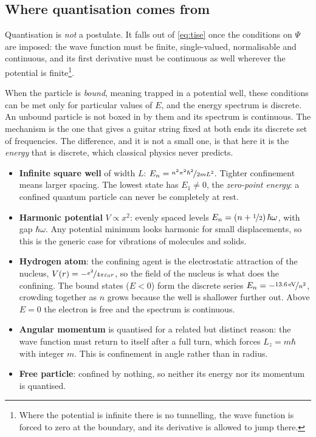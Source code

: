     \subsection{Where quantisation comes from}
    \label{sec:quantisation}

        Quantisation is \emph{not} a postulate. It falls out of \cref{eq:tise} once the conditions on $\Psi$ are imposed: the wave function must be finite, single-valued, normalisable and continuous, and its first derivative must be continuous as well wherever the potential is finite\footnote{Where the potential is infinite there is no tunnelling, the wave function is forced to zero at the boundary, and its derivative is allowed to jump there.}.

        When the particle is \emph{bound}, meaning trapped in a potential well, these conditions can be met only for particular values of $E$, and the energy spectrum is discrete. An unbound particle is not boxed in by them and its spectrum is continuous. The mechanism is the one that gives a guitar string fixed at both ends its discrete set of frequencies. The difference, and it is not a small one, is that here it is the \emph{energy} that is discrete, which classical physics never predicts.

        \begin{itemize}
            \item \textbf{Infinite square well} of width $L$: $E_{n} = \nicefrac{n^{2}\pi^{2}\hbar^{2}}{2mL^{2}}$. Tighter confinement means larger spacing. The lowest state has $E_{1} \neq 0$, the \emph{zero-point energy}: a confined quantum particle can never be completely at rest.
            \item \textbf{Harmonic potential} $V \propto x^{2}$: evenly spaced levels $E_{n} = \left(n + \nicefrac{1}{2}\right)\hbar\omega$, with gap $\hbar\omega$. Any potential minimum looks harmonic for small displacements, so this is the generic case for vibrations of molecules and solids.
            \item \textbf{Hydrogen atom}: the confining agent is the electrostatic attraction of the nucleus, $V(r) = -\nicefrac{e^{2}}{4\pi\varepsilon_{0}r}$, so the field of the nucleus is what does the confining. The bound states ($E<0$) form the discrete series $E_{n} = -\nicefrac{13.6\,\mathrm{eV}}{n^{2}}$, crowding together as $n$ grows because the well is shallower further out. Above $E = 0$ the electron is free and the spectrum is continuous.
            \item \textbf{Angular momentum} is quantised for a related but distinct reason: the wave function must return to itself after a full turn, which forces $L_{z} = m\hbar$ with integer $m$. This is confinement in angle rather than in radius.
            \item \textbf{Free particle}: confined by nothing, so neither its energy nor its momentum is quantised.
        \end{itemize}


